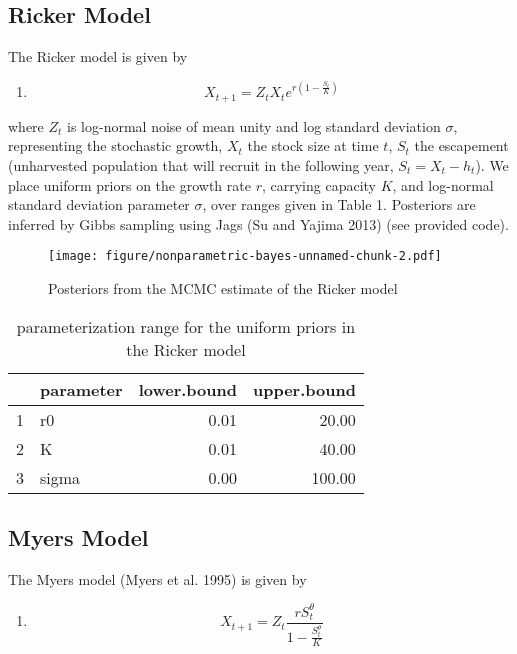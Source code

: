 \documentclass[author-year, review]{elsarticle} %
\makeatletter
\def\maxwidth{\ifdim\Gin@nat@width>\linewidth\linewidth
\else\Gin@nat@width\fi}
\let\Oldincludegraphics\includegraphics
\renewcommand{\includegraphics}[1]{\Oldincludegraphics[width=\maxwidth]{#1}}
\makeatother
\begin{document}
\subsection{Ricker Model}\label{ricker-model}

The Ricker model is given by

\begin{enumerate}
\def\labelenumi{(\arabic{enumi})}
\itemsep1pt\parskip0pt
\item
  \[X_{t+1} = Z_t X_t e^{r \left(1 - \frac{S_t}{K} \right) } \]
\end{enumerate}

where $Z_t$ is log-normal noise of mean unity and log standard deviation
$\sigma$, representing the stochastic growth, $X_t$ the stock size at
time $t$, $S_t$ the escapement (unharvested population that will recruit
in the following year, $S_t = X_t - h_t$). We place uniform priors on
the growth rate $r$, carrying capacity $K$, and log-normal standard
deviation parameter $\sigma$, over ranges given in Table 1. Posteriors
are inferred by Gibbs sampling using Jags (Su and Yajima 2013) (see
provided code).

\begin{figure}[htbp]
\centering
\texttt{[image: figure/nonparametric-bayes-unnamed-chunk-2.pdf]}
\caption{Posteriors from the MCMC estimate of the Ricker model}
\end{figure}

\begin{table}[ht]
\begin{center}
\begin{tabular}{rlrr}
  \hline
 & parameter & lower.bound & upper.bound \\ 
  \hline
1 & r0 & 0.01 & 20.00 \\ 
  2 & K & 0.01 & 40.00 \\ 
  3 & sigma & 0.00 & 100.00 \\ 
   \hline
\end{tabular}
\caption{parameterization range for the uniform priors in the Ricker model}
\end{center}
\end{table}

\subsection{Myers Model}\label{myers-model}

The Myers model (Myers et al. 1995) is given by

\begin{enumerate}
\def\labelenumi{(\arabic{enumi})}
\setcounter{enumi}{1}
\itemsep1pt\parskip0pt
\item
  \[ X_{t+1} = Z_t \frac{r S_t^{\theta}}{1 - \frac{S_t^\theta}{K}}\]
\end{enumerate}
\end{document}
